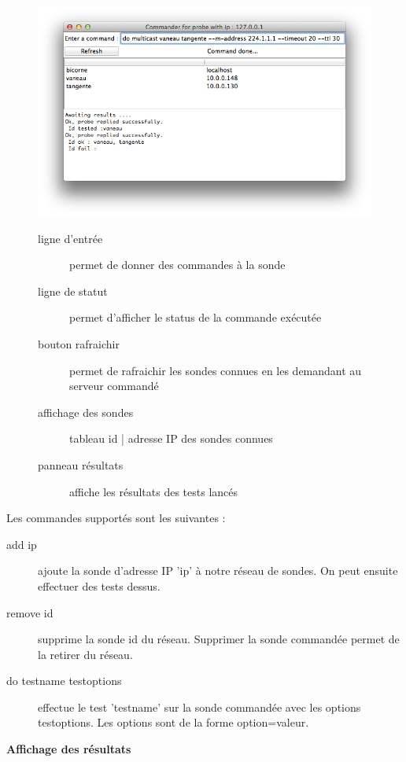 \documentclass[a4paper,11pt]{article}
\begin{document}
\begin{figure}[!ht]
\begin{minipage}[c]{0.5\linewidth}
\centering\includegraphics[width=\linewidth]{img/commander.png}
\end{minipage}
\hfill
\begin{minipage}[c]{0.5\linewidth}
\begin{description}
\item[ligne d'entrée] permet de donner des commandes à la sonde
\item[ligne de statut] permet d'afficher le status de la commande exécutée
\item[bouton rafraichir] permet de rafraichir les sondes connues en les demandant au serveur commandé
\item[affichage des sondes] tableau id | adresse IP des sondes connues
\item[panneau résultats] affiche les résultats des tests lancés
\end{description}
\end{minipage}
\end{figure}
\FloatBarrier

Les commandes supportés sont les suivantes :
\begin{description}
\item[add ip] ajoute la sonde d'adresse IP 'ip' à notre réseau de sondes. On peut ensuite effectuer des tests dessus.
\item[remove id] supprime la sonde id du réseau. Supprimer la sonde commandée permet de la retirer du réseau.
\item[do testname testoptions] effectue le test 'testname' sur la sonde commandée avec les options testoptions. Les options sont de la forme option=valeur.
\end{description}
\vspace{2ex}
\textbf{Affichage des résultats}
\end{document}
